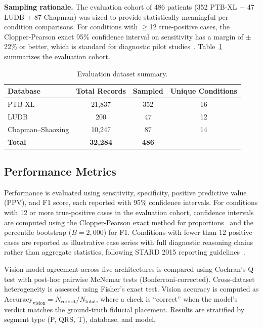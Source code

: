\documentclass[journal,compsoc]{IEEEtran}
\begin{document}
\textbf{Sampling rationale.} The evaluation cohort of 486 patients (352 PTB-XL + 47 LUDB + 87 Chapman) was sized to provide statistically meaningful per-condition comparisons. For conditions with $\geq$12 true-positive cases, the Clopper-Pearson exact 95\% confidence interval on sensitivity has a margin of $\pm$22\% or better, which is standard for diagnostic pilot studies~\cite{flahault2005sample}. Table~\ref{tab:datasets} summarizes the evaluation cohort.

\begin{table}[t]
\centering
\caption{Evaluation dataset summary.}
\label{tab:datasets}
\begin{tabular}{lccc}
\toprule
Database & Total Records & Sampled & Unique Conditions \\
\midrule
PTB-XL & 21{,}837 & 352 & 16 \\
LUDB & 200 & 47 & 12 \\
Chapman--Shaoxing & 10{,}247 & 87 & 14 \\
\midrule
\textbf{Total} & \textbf{32{,}284} & \textbf{486} & --- \\
\bottomrule
\end{tabular}
\end{table}

\subsection{Performance Metrics}
\label{sec:metrics}

Performance is evaluated using sensitivity, specificity, positive predictive value (PPV), and F1 score, each reported with 95\% confidence intervals. For conditions with 12 or more true-positive cases in the evaluation cohort, confidence intervals are computed using the Clopper-Pearson exact method for proportions~\cite{newcombe1998ci} and the percentile bootstrap ($B = 2{,}000$) for F1. Conditions with fewer than 12 positive cases are reported as illustrative case series with full diagnostic reasoning chains rather than aggregate statistics, following STARD 2015 reporting guidelines~\cite{bossuyt2015stard}.

Vision model agreement across five architectures is compared using Cochran's Q test with post-hoc pairwise McNemar tests (Bonferroni-corrected). Cross-dataset heterogeneity is assessed using Fisher's exact test. Vision accuracy is computed as $\text{Accuracy}_{\text{vision}} = N_{\text{correct}} / N_{\text{total}}$, where a check is ``correct'' when the model's verdict matches the ground-truth fiducial placement. Results are stratified by segment type (P, QRS, T), database, and model.
\end{document}
